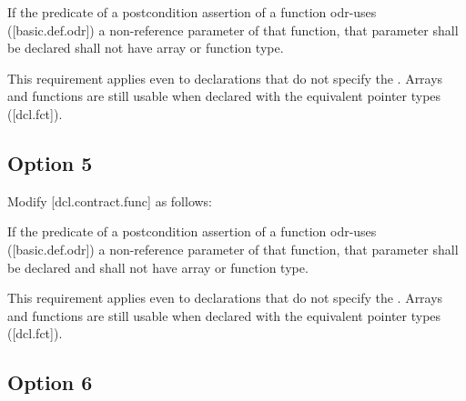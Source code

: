 \begin{adjustwidth}{0.5cm}{0.5cm}
If the predicate of a postcondition assertion of a function odr-uses ([basic.def.odr]) a
non-reference parameter of that function, that parameter shall be declared \added{, }shall not have array or function type.
\begin{note}
This requirement applies even to declarations
that do not specify the . Arrays and functions are still usable when declared with the equivalent pointer types ([dcl.fct]).
\end{note}
\begin{example}
\tcode{[...]}
\end{example}
\end{adjustwidth}

\subsection{Option 5}

Modify [dcl.contract.func] as follows:

\begin{adjustwidth}{0.5cm}{0.5cm}
If the predicate of a postcondition assertion of a function odr-uses ([basic.def.odr]) a
non-reference parameter of that function, that parameter shall be declared  and shall not have array or function type.
\begin{note}
This requirement applies even to declarations
that do not specify the . Arrays and functions are still usable when declared with the equivalent pointer types ([dcl.fct]).
\end{note}
\begin{example}
\tcode{[...]}
\end{example}

\end{adjustwidth}

\subsection{Option 6}

